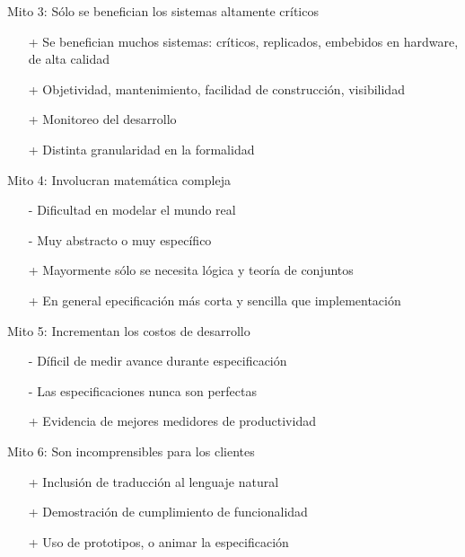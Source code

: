 \documentclass{beamer}
\begin{document}
\begin{frame}{Mito 3: S\'olo se benefician los sistemas altamente cr\'iticos}
\begin{itemize}[<+->]
\item[+] Se benefician muchos sistemas: cr\'iticos, replicados, embebidos en hardware, de alta calidad
\item[+] Objetividad, mantenimiento, facilidad de construcci\'on, visibilidad 
\item[+] Monitoreo del desarrollo
\item[+] Distinta granularidad en la formalidad
\end{itemize}
\end{frame}
 
\begin{frame}{Mito 4: Involucran matem\'atica compleja}
\begin{itemize}[<+->]
\item[-] Dificultad en modelar el mundo real
\item[-] Muy abstracto o muy espec\'ifico 
\item[+] Mayormente sólo se necesita l\'ogica y teor\'ia de conjuntos
\item[+] En general epecificaci\'on m\'as corta y sencilla que implementaci\'on
\end{itemize}
\end{frame}
 
\begin{frame}{Mito 5: Incrementan los costos de desarrollo}
\begin{itemize}[<+->]
\item[-] D\'ificil de medir avance durante especificaci\'on{}
\item[-] Las especificaciones nunca son perfectas
\item[+] Evidencia de mejores medidores de productividad
\end{itemize}
\end{frame}
 
\begin{frame}{Mito 6: Son incomprensibles para los clientes}
\begin{itemize}[<+->]
\item[+] Inclusi\'on de traducci\'on al lenguaje natural
\item[+] Demostraci\'on de cumplimiento de funcionalidad
\item[+] Uso de prototipos, o animar la especificaci\'on
\end{itemize}
\end{frame}
 
\end{document}

